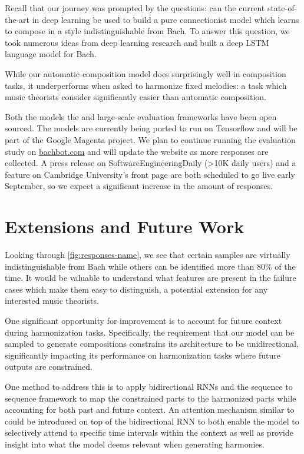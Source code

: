 Recall that our journey was prompted by the questions: can the current
state-of-the-art in deep learning be used to build a pure connectionist
model which learns to compose in a style indistinguishable from Bach. To
answer this question, we took numerous ideas from deep learning research
and built a deep LSTM language model for Bach.

While our automatic composition model does surprisingly well in composition
tasks, it underperforms when asked to harmonize fixed melodies: a task which
music theorists consider significantly easier than automatic composition.

Both the models the and large-scale evaluation frameworks have been open
sourced. The models are currently being ported to run on Tensorflow and will be
part of the Google Magenta project. We plan to continue running the evaluation
study on \url{bachbot.com} and will update the website as more responses are
collected. A press release on SoftwareEngineeringDaily (>10K daily users) and a
feature on Cambridge University's front page are both scheduled to go live
early September, so we expect a significant increase in the amount of
responses.

\section{Extensions and Future Work}

Looking through \vref{fig:responses-name}, we see that certain
samples are virtually indistinguishable from Bach while others
can be identified more than $80\%$ of the time. It would be valuable
to understand what features are present in the failure cases which
make them easy to distinguish, a potential extension for any
interested music theorists.

One significant opportunity for improvement is to account for future
context during harmonization tasks. Specifically, the requirement that
our model can be sampled to generate compositions constrains its
architecture to be unidirectional, significantly impacting its
performance on harmonization tasks where future outputs are constrained.

One method to address this is to apply bidirectional
RNNs\citep{Graves2005} and the sequence to sequence
framework\citep{sutskever2014sequence} to map the constrained parts to
the harmonized parts while accounting for both past and future context.
An attention mechanism similar to \citet{Bahdanau2015} could be
introduced on top of the bidirectional RNN to both enable the model to
selectively attend to specific time intervals within the context as well
as provide insight into what the model deems relevant when generating
harmonies.


